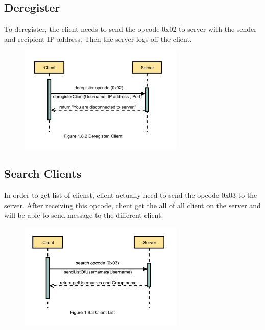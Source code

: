     \subsection{Deregister}\label{subsec:deregister}
    To deregister, the client  needs to send the opcode 0x02 to server  with the sender and
    recipient IP address.
    Then the server logs off the client.
    
		    \begin{figure}
		    	\centering
		    		\includegraphics[width=0.7\textwidth]{gfx/1.8.2_Deregister_Client}
		    	\label{fig:deregister-client}
		    \end{figure}


    \subsection{Search Clients}\label{subsec:search}
    In order to get list of clienst, client actually need to send  the opcode 0x03 to  the
    server.
    After receiving this opcode, client get the all of all client on the server and will be
    able to send message to the different client.
    
		    \begin{figure}
		    	\centering
		    
		    	\includegraphics[width=0.7\textwidth]{gfx/1.8.3_Client_List}
		    	\label{fig:client-list}
		    \end{figure}


